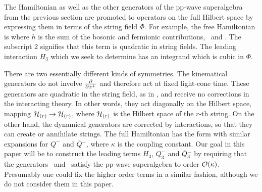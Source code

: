 The Hamiltonian as well as the other
generators of the pp-wave superalgebra from the previous
section
are promoted to operators on the full
Hilbert space by expressing them in terms of the string field $\Phi$.
For example, the free Hamiltonian is
\eqn{}
where $h$ is the sum of the bosonic and fermionic
contributions, \hghd\ and \fham.
The subscript $2$ signifies that this term is quadratic in
string fields.  
The leading interaction $H_3$ which we
seek to determine has an integrand which is cubic in $\Phi$.


There are two essentially different kinds of symmetries.
The kinematical generators
\eqn{}
do not involve $\partial \over \partial x^+$ and therefore act at fixed
light-cone time.  These generators are quadratic in the string
field, as in \hfield, and receive no corrections
in the interacting theory.
In other words, they act diagonally on the Hilbert space,
mapping ${\cal{H}}_{(r)} \to {\cal{H}}_{(r)}$, where
${\cal{H}}_{(r)}$ is the Hilbert space of the $r$-th string.
On the other hand, the dynamical generators
\eqn{}
are corrected by interactions, so that they can create
or annihilate strings.
The full Hamiltonian
has the form
\eqn{}
with similar expansions for $Q^-$ and $\overline{Q}{}^-$,
where $\kappa$ is the  coupling constant.
Our goal in this paper will be to construct the leading terms $H_3$,
$Q^-_3$ and $\overline{Q}{}^-_3$ by requiring that the
generators \kine\ and \dynam\ satisfy the pp-wave superalgebra
to order ${\cal{O}}(\kappa)$.
Presumably
one could fix the higher order terms
in a similar fashion, although we do not consider them in this paper.


